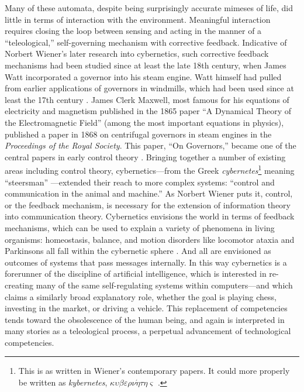 Many of these automata, despite being surprisingly accurate
mimeses of life, did little in terms of interaction with the
environment. Meaningful interaction requires closing the loop between
sensing and acting in the manner of a
 ``teleological,'' self-governing mechanism with corrective feedback.
 Indicative of Norbert Wiener's later research into cybernetics, such
 corrective feedback mechanisms had been studied since at least the
 late 18th century, when James Watt incorporated a governor into his
 steam engine. Watt himself had pulled from earlier applications of
 governors in windmills, which had been used since at least the 17th
 century \cite{richardhills}. James Clerk Maxwell, most famous for his equations of
 electricity and magnetism published in the 1865 paper ``A Dynamical
 Theory of the Electromagnetic Field'' (among the most important
 equations in physics), published a paper in 1868 on centrifugal
 governors in steam engines in the \emph{Proceedings of the Royal Society}. This
 paper, ``On Governors,'' became one of the central papers in early
 control theory \cite{ottomayr}. Bringing together a number of existing
 areas including control theory,
 cybernetics---from the Greek \emph{cybernetes}\footnote{This is as
   written in Wiener's contemporary papers. It could more properly be written
   as \emph{kybernetes},
   $\kappa\upsilon\beta\varepsilon\rho\nu\acute{\eta}\tau\eta\varsigma$
   \cite[p. 11]{cybernetics}.} meaning 
 ``steersman'' \cite[p. 6]{wienerMainIdeas}---extended their reach to more complex
 systems: ``control and communication in the animal and machine.'' As
 Norbert Wiener puts it, control, or the
 feedback mechanism, is necessary for the extension of information
 theory into communication theory. Cybernetics envisions the world in
 terms of feedback mechanisms, which can be used to explain a variety
 of phenomena in living organisms: homeostasis, balance, and motion
 disorders like locomotor ataxia and Parkinsons all fall within the
 cybernetic sphere \cite[p. 10-15]{wienerMainIdeas}. And all are envisioned
 as outcomes of systems that pass messages internally. In this way
 cybernetics is a forerunner of the discipline of
 artificial intelligence, which is interested in re-creating many of the same
 self-regulating systems within computers---and which claims a
 similarly broad explanatory role, whether the goal is playing chess,
 investing in the market, or driving a vehicle. This replacement of
 competencies tends toward the obsolescence of the human being, and
 again is interpreted in many stories as a teleological process, a
 perpetual advancement of technological competencies.

